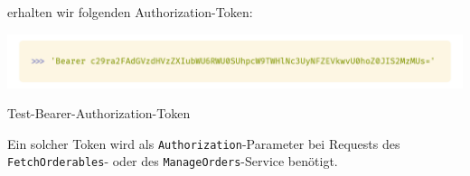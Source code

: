 erhalten wir folgenden Authorization-Token:

\begin{code}[H]
    \centering
    \includegraphics[width=1\textwidth]{images/Client/services/bearer-auth/testToken.png}
    \vspace{-25pt}
    \caption{Test-Bearer-Authorization-Token}
\end{code}

Ein solcher Token wird als \lstinline{Authorization}-Parameter bei Requests des \lstinline{FetchOrderables}-
oder des \lstinline{ManageOrders}-Service benötigt.